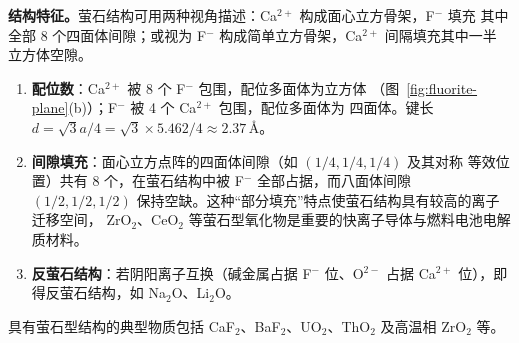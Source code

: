 \textbf{结构特征。}萤石结构可用两种视角描述：Ca$^{2+}$ 构成面心立方骨架，F$^-$ 填充
其中全部 8 个四面体间隙；或视为 F$^-$ 构成简单立方骨架，Ca$^{2+}$ 间隔填充其中一半
立方体空隙。

\begin{enumerate}[label=（\arabic*）]
  \item \textbf{配位数}：Ca$^{2+}$ 被 8 个 F$^-$ 包围，配位多面体为立方体
    （图~\ref{fig:fluorite-plane}(b)）；F$^-$ 被 4 个 Ca$^{2+}$ 包围，配位多面体为
    四面体。键长 $d=\sqrt{3}a/4=\sqrt{3}\times5.462/4\approx2.37$\,\AA。
  \item \textbf{间隙填充}：面心立方点阵的四面体间隙（如 $(1/4,1/4,1/4)$ 及其对称
    等效位置）共有 8 个，在萤石结构中被 F$^-$ 全部占据，而八面体间隙
    $(1/2,1/2,1/2)$ 保持空缺。这种``部分填充''特点使萤石结构具有较高的离子迁移空间，
    ZrO$_2$、CeO$_2$ 等萤石型氧化物是重要的快离子导体与燃料电池电解质材料。
  \item \textbf{反萤石结构}：若阴阳离子互换（碱金属占据 F$^-$ 位、O$^{2-}$ 占据
    Ca$^{2+}$ 位），即得反萤石结构，如 Na$_2$O、Li$_2$O。
\end{enumerate}

具有萤石型结构的典型物质包括 CaF$_2$、BaF$_2$、UO$_2$、ThO$_2$ 及高温相 ZrO$_2$ 等。
